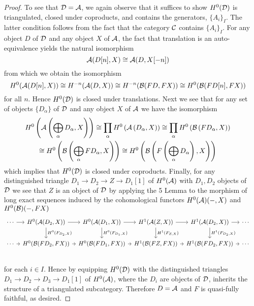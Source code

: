 \begin{proof}
  To see that \(\mathcal{D} = \mathcal{A}\), we again observe that it suffices to show \(H^0(\mathcal{D})\) is triangulated, closed under coproducts, and contains the generators, \(\{A_i\}_I\).
  The latter condition follows from the fact that the category \(\mathcal{C}\) contains \(\{A_i\}_I\).
  For any object \(D\) of \(\mathcal{D}\) and any object \(X\) of \(\mathcal{A}\), the fact that translation is an auto-equivalence yields the natural isomorphism
  \[\mathcal{A}(D[n], X) \cong \mathcal{A}(D, X[-n])\]
  from which we obtain the isomorphism
  \[H^0(\mathcal{A}(D[n], X)) \cong H^{-n}(\mathcal{A}(D,X)) \cong H^{-n}(\mathcal{B}(FD, FX)) \cong H^0(\mathcal{B}(FD[n], FX))\]
  for all \(n\).
  Hence \(H^0(\mathcal{D})\) is closed under translations.
  Next we see that for any set of objects \(\{D_\alpha\}\) of \(\mathcal{D}\) and any object \(X\) of \(\mathcal{A}\) we have the isomorphism
  \begin{gather*}
    H^0\left(\mathcal{A}\left(\bigoplus_\alpha D_\alpha, X\right)\right)
  \cong \prod_\alpha H^0\left(\mathcal{A}\left(D_\alpha, X\right)\right)
    \cong \prod_\alpha H^0\left(\mathcal{B}\left(FD_\alpha, X\right)\right)\\
    \cong H^0\left(\mathcal{B}\left(\bigoplus_\alpha FD_\alpha, X\right)\right)
    \cong H^0\left(\mathcal{B}\left(F\left(\bigoplus_\alpha D_\alpha\right), X\right)\right)
  \end{gather*}
  which implies that \(H^0(\mathcal{D})\) is closed under coproducts.
  Finally, for any distinguished triangle \(D_1 \to D_2 \to Z \to D_1[1]\) of \(H^0(\mathcal{A})\) with \(D_1, D_2\) objects of \(\mathcal{D}\) we see that \(Z\) is an object of \(\mathcal{D}\) by applying the 5 Lemma to the morphism of long exact sequences induced by the cohomological functors \(H^0(\mathcal{A})(-, X)\) and \(H^0(\mathcal{B})(-, FX)\)
  \[\begin{tikzcd}[column sep=tiny]
  \cdots \arrow{r} & H^0(\A(D_2, X)) \arrow{r}\arrow{d}{H^0(F_{D_2,X})} & H^0(\A(D_1, X)) \arrow{r}\arrow{d}{H^0(F_{D_1,X})} & H^1(\A(Z, X)) \arrow{r}\arrow{d}{H^1(F_{Z,X})} & H^1(\A(D_2, X)) \arrow{r}\arrow{d}{H^1(F_{D_2,X})} & \cdots\\
  \cdots \arrow{r} & H^0(\B(FD_2, FX)) \arrow{r} & H^0(\B(FD_1, FX)) \arrow{r} & H^1(\B(FZ, FX)) \arrow{r} & H^1(\B(FD_2, FX)) \arrow{r}& \cdots\\
  \end{tikzcd}\]
  for each \(i \in I\).
  Hence by equipping \(H^0(\mathcal{D})\) with the distinguished triangles \(D_1 \to D_2 \to D_3 \to D_1[1]\) of \(H^0(\mathcal{A})\), where the \(D_i\) are objects of \(\mathcal{D}\), inherits the structure of a triangulated subcategory.
  Therefore \(D = \mathcal{A}\) and \(F\) is quasi-fully faithful, as desired.


\end{proof}

